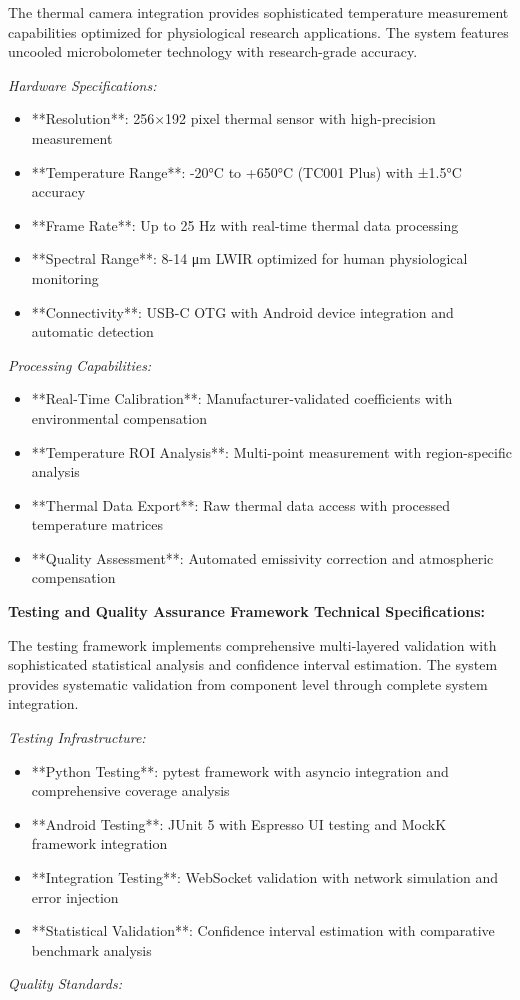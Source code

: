 \documentclass[11pt,a4paper]{article}
\begin{document}
The thermal camera integration provides sophisticated temperature measurement capabilities optimized for physiological
research applications. The system features uncooled microbolometer technology with research-grade accuracy.

\textit{Hardware Specifications:}

\begin{itemize}
\item **Resolution**: 256×192 pixel thermal sensor with high-precision measurement
\item **Temperature Range**: -20°C to +650°C (TC001 Plus) with ±1.5°C accuracy
\item **Frame Rate**: Up to 25 Hz with real-time thermal data processing
\item **Spectral Range**: 8-14 μm LWIR optimized for human physiological monitoring
\item **Connectivity**: USB-C OTG with Android device integration and automatic detection

\end{itemize}
\textit{Processing Capabilities:}

\begin{itemize}
\item **Real-Time Calibration**: Manufacturer-validated coefficients with environmental compensation
\item **Temperature ROI Analysis**: Multi-point measurement with region-specific analysis
\item **Thermal Data Export**: Raw thermal data access with processed temperature matrices
\item **Quality Assessment**: Automated emissivity correction and atmospheric compensation

\end{itemize}
\textbf{Testing and Quality Assurance Framework Technical Specifications:}

The testing framework implements comprehensive multi-layered validation with sophisticated statistical analysis and
confidence interval estimation. The system provides systematic validation from component level through complete system
integration.

\textit{Testing Infrastructure:}

\begin{itemize}
\item **Python Testing**: pytest framework with asyncio integration and comprehensive coverage analysis
\item **Android Testing**: JUnit 5 with Espresso UI testing and MockK framework integration
\item **Integration Testing**: WebSocket validation with network simulation and error injection
\item **Statistical Validation**: Confidence interval estimation with comparative benchmark analysis

\end{itemize}
\textit{Quality Standards:}
\end{document}
